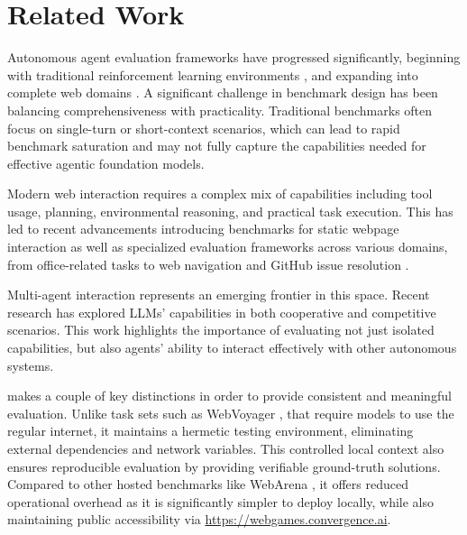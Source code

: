 \section{Related Work}
Autonomous agent evaluation frameworks have progressed significantly, beginning with traditional reinforcement learning environments \citep{brockman2016openai}, and expanding into complete web domains \citep{shi2017world, liu2018reinforcement}. 
A significant challenge in benchmark design has been balancing comprehensiveness with practicality. Traditional benchmarks often focus on single-turn or short-context scenarios, which can lead to rapid benchmark saturation \citep{kiela2021dynabench} and may not fully capture the capabilities needed for effective agentic foundation models.

Modern web interaction requires a complex mix of capabilities including tool usage, planning, environmental reasoning, and practical task execution. This has led to 
recent advancements introducing benchmarks for static webpage interaction \citep{deng2024mind2web} as well as specialized evaluation frameworks across various domains, from office-related tasks \citep{liu2023agentbench, qin2024sysbench} to web navigation \citep{yao2022webshop, zhou2023webarena} and GitHub issue resolution \citep{jimenez2023swe}.

Multi-agent interaction represents an emerging frontier in this space. Recent research has explored LLMs' capabilities in both cooperative \citep{gong2023mindagent, piatti2024cooperate} and competitive \citep{jin2024learning, wu2024enhance} scenarios. This work highlights the importance of evaluating not just isolated capabilities, but also agents' ability to interact effectively with other autonomous systems.
 
\name makes a couple of key distinctions in order to provide consistent and meaningful evaluation. Unlike task sets such as WebVoyager \citep{he2024webvoyager}, that require models to use the regular internet, it maintains a hermetic testing environment, eliminating external dependencies and network variables. This controlled local context also ensures reproducible evaluation by providing verifiable ground-truth solutions. Compared to other hosted benchmarks like WebArena \citep{zhou2023webarena}, it offers reduced operational overhead as it is significantly simpler to deploy locally, while also maintaining public accessibility via \url{https://webgames.convergence.ai}.
